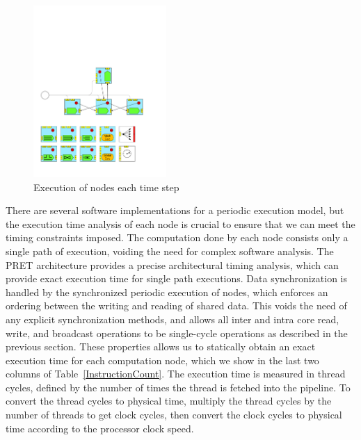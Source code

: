 \begin{figure}
\centering
\includegraphics[width=0.45\textwidth,page=5]{./figs/1dcfd/ElementalProcessors.pdf}
\caption{Execution of nodes each time step}
\label{fig:software_model}
\end{figure}
There are several software implementations for a periodic execution model, but the execution time analysis of each node is crucial to ensure that we can meet the timing constraints imposed. 
The computation done by each node consists only a single path of execution, voiding the need for complex software analysis.
The PRET architecture provides a precise architectural timing analysis, which can provide exact execution time for single path executions.     
Data synchronization is handled by the synchronized periodic execution of nodes, which enforces an ordering between the writing and reading of shared data.
This voids the need of any explicit synchronization methods, and allows all inter and intra core read, write, and broadcast operations to be single-cycle operations as described in the previous section. 
These properties allows us to statically obtain an exact execution time for each computation node, which we show in the last two columns of Table~\ref{InstructionCount}. 
The execution time is measured in thread cycles, defined by the number of times the thread is fetched into the pipeline. 
To convert the thread cycles to physical time, multiply the thread cycles by the number of threads to get clock cycles, then convert the clock cycles to physical time according to the processor clock speed.  

